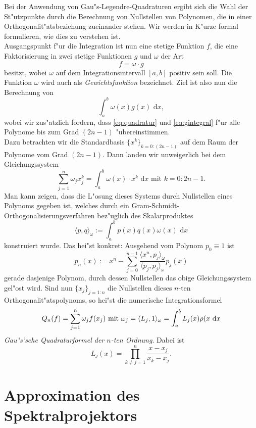 Bei der Anwendung von Gau"s-Legendre-Quadraturen ergibt sich die Wahl der St"utzpunkte durch die Berechnung von Nullstellen von Polynomen, die in einer Orthogonalit"atsbeziehung zueinander stehen.
Wir werden in K"urze formal formulieren, wie dies zu verstehen ist.\\

Ausgangspunkt f"ur die Integration ist nun eine stetige Funktion $f$, die eine Faktorisierung in zwei stetige Funktionen $g$ und $\omega$ der Art
\[
f = \omega \cdot g
\]
besitzt, wobei $\omega$ auf dem Integrationsintervall $[a,b]$ positiv sein soll. Die Funktion $\omega$ wird auch als \emph{Gewichtsfunktion} bezeichnet.
Ziel ist also nun die Berechnung von
\begin{equation}\label{eq:gintegral}
\int_a^b \omega(x)g(x) \text{ d}x,
\end{equation}
wobei wir zus"atzlich fordern, dass \eqref{eq:quadratur} und \eqref{eq:gintegral} f"ur alle Polynome bis zum Grad $(2n-1)$ "ubereinstimmen.\\

Dazu betrachten wir die Standardbasis $\{x^k\}_{k=0:(2n-1)}$ auf dem Raum der Polynome vom
Grad $(2n-1)$. Dann landen wir unweigerlich bei dem
Gleichungssystem
\[
\sum_{j=1}^n \omega_j x_j^k = \int_a^b \omega(x)\cdot x^k \text{ d}x \text{ mit } k = 0:2n-1.
\]
Man kann zeigen, dass die L"osung dieses Systems durch Nullstellen eines Polynoms gegeben ist, welches durch
ein Gram-Schmidt-Orthogonalisierungsverfahren bez"uglich des Skalarproduktes
\[
\langle p,q\rangle_\omega := \int_a^b p(x) q(x)\omega(x) \text{ d}x
\]
konstruiert wurde. Das hei"st konkret: Ausgehend vom Polynom $p_0 \equiv 1$ ist
\[
p_n(x) := x^n - \sum_{j=0}^{n-1} \frac{\langle x^n, p_j \rangle_\omega}{\langle p_j, p_j\rangle_\omega} p_j (x)
\]
gerade dasjenige Polynom, durch dessen Nullstellen das obige Gleichungssystem gel"ost wird. Sind nun
$\{x_j\}_{j=1:n}$ die Nullstellen dieses $n$-ten Orthogonalit"atspolynoms, so hei"st die numerische
Integrationsformel
\[
Q_n(f) = \sum_{j=1}^n \omega_j f(x_j) \text{ mit }
\omega_j = \langle L_j, 1 \rangle_\omega
= \int_a^b L_j(x)\rho(x\text{ d}x
\]
\emph{Gau"s'sche Quadraturformel der $n$-ten Ordnung}.
Dabei ist
\[
L_j(x) = \prod_{k\neq j=1}^n \frac{x-x_j}{x_k - x_j}.
\]

\newpage

\section{Approximation des Spektralprojektors}

